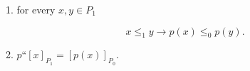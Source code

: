 1. for every $x, y \in P_1$

$$x \leq_1 y \rightarrow p(x) \leq_0 p(y).$$

2. $p“[x]_{P_1} = [p(x)]_{P_0}$.
